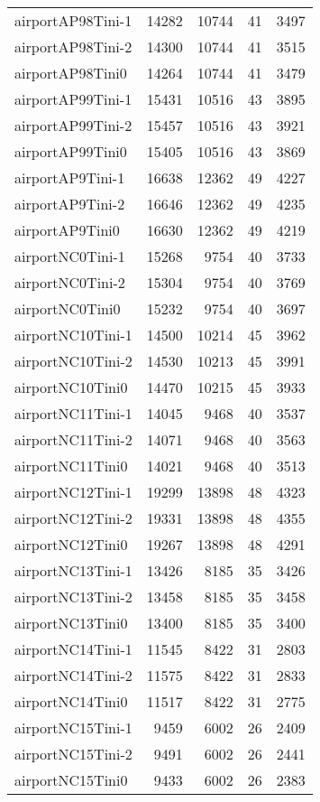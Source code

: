 \begin{longtable}{lrrrr}
airportAP98Tini-1 & 14282 & 10744 & 41 & 3497 \\
airportAP98Tini-2 & 14300 & 10744 & 41 & 3515 \\
airportAP98Tini0 & 14264 & 10744 & 41 & 3479 \\
airportAP99Tini-1 & 15431 & 10516 & 43 & 3895 \\
airportAP99Tini-2 & 15457 & 10516 & 43 & 3921 \\
airportAP99Tini0 & 15405 & 10516 & 43 & 3869 \\
airportAP9Tini-1 & 16638 & 12362 & 49 & 4227 \\
airportAP9Tini-2 & 16646 & 12362 & 49 & 4235 \\
airportAP9Tini0 & 16630 & 12362 & 49 & 4219 \\
airportNC0Tini-1 & 15268 & 9754 & 40 & 3733 \\
airportNC0Tini-2 & 15304 & 9754 & 40 & 3769 \\
airportNC0Tini0 & 15232 & 9754 & 40 & 3697 \\
airportNC10Tini-1 & 14500 & 10214 & 45 & 3962 \\
airportNC10Tini-2 & 14530 & 10213 & 45 & 3991 \\
airportNC10Tini0 & 14470 & 10215 & 45 & 3933 \\
airportNC11Tini-1 & 14045 & 9468 & 40 & 3537 \\
airportNC11Tini-2 & 14071 & 9468 & 40 & 3563 \\
airportNC11Tini0 & 14021 & 9468 & 40 & 3513 \\
airportNC12Tini-1 & 19299 & 13898 & 48 & 4323 \\
airportNC12Tini-2 & 19331 & 13898 & 48 & 4355 \\
airportNC12Tini0 & 19267 & 13898 & 48 & 4291 \\
airportNC13Tini-1 & 13426 & 8185 & 35 & 3426 \\
airportNC13Tini-2 & 13458 & 8185 & 35 & 3458 \\
airportNC13Tini0 & 13400 & 8185 & 35 & 3400 \\
airportNC14Tini-1 & 11545 & 8422 & 31 & 2803 \\
airportNC14Tini-2 & 11575 & 8422 & 31 & 2833 \\
airportNC14Tini0 & 11517 & 8422 & 31 & 2775 \\
airportNC15Tini-1 & 9459 & 6002 & 26 & 2409 \\
airportNC15Tini-2 & 9491 & 6002 & 26 & 2441 \\
airportNC15Tini0 & 9433 & 6002 & 26 & 2383 \\

\end{longtable}
